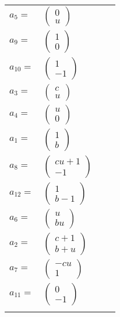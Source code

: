 \documentclass[1p]{elsarticle_modified}
\theoremstyle{definition}
\begin{document}
\begin{tabular}{m{7pt} m{180pt} m{7pt} m{180pt} }
\flushright $a_{5}=$&$\begin{pmatrix}0\\u\end{pmatrix}$ \\
\flushright $a_{9}=$&$\begin{pmatrix}1\\0\end{pmatrix}$ \\
\flushright $a_{10}=$&$\begin{pmatrix}1\\-1\end{pmatrix}$ \\
\flushright $a_{3}=$&$\begin{pmatrix}c\\u\end{pmatrix}$ \\
\flushright $a_{4}=$&$\begin{pmatrix}u\\0\end{pmatrix}$ \\
\flushright $a_{1}=$&$\begin{pmatrix}1\\b\end{pmatrix}$ \\
\flushright $a_{8}=$&$\begin{pmatrix}c u+1\\-1\end{pmatrix}$ \\
\flushright $a_{12}=$&$\begin{pmatrix}1\\b-1\end{pmatrix}$ \\
\flushright $a_{6}=$&$\begin{pmatrix}u\\b u\end{pmatrix}$ \\
\flushright $a_{2}=$&$\begin{pmatrix}c+1\\b+u\end{pmatrix}$ \\
\flushright $a_{7}=$&$\begin{pmatrix}- c u\\1\end{pmatrix}$ \\
\flushright $a_{11}=$&$\begin{pmatrix}0\\-1\end{pmatrix}$\\&\end{tabular}
\end{document}
